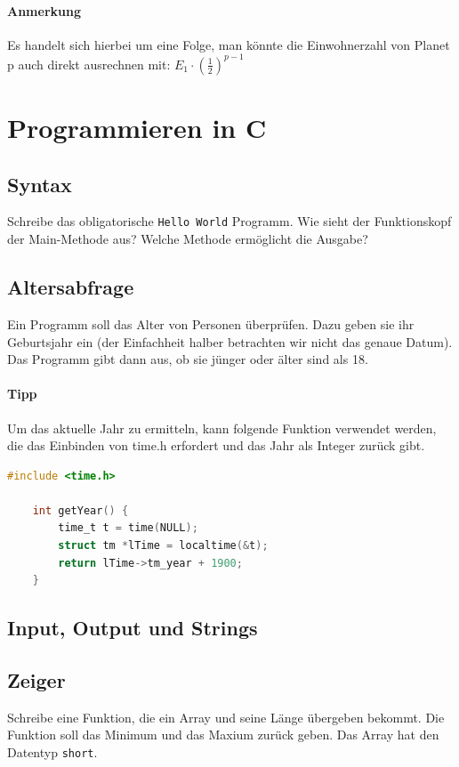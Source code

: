 \documentclass[11pt, a4paper]{article}
\begin{document}
\paragraph{Anmerkung} Es handelt sich hierbei um eine Folge, man könnte die Einwohnerzahl von Planet p auch direkt ausrechnen mit: $E_1 \cdot \left(\frac{1}{2}\right)^{p-1}$


\newpage
\section{Programmieren in C}
\subsection{Syntax}
Schreibe das obligatorische \texttt{Hello World} Programm. Wie sieht der Funktionskopf der Main-Methode aus? Welche Methode ermöglicht die Ausgabe?


\subsection{Altersabfrage}
Ein Programm soll das Alter von Personen überprüfen. Dazu geben sie ihr Geburtsjahr ein (der Einfachheit halber betrachten wir nicht das genaue Datum). Das Programm gibt dann aus, ob sie jünger oder älter sind als 18.

\paragraph{Tipp} Um das aktuelle Jahr zu ermitteln, kann folgende Funktion verwendet werden, die das Einbinden von time.h erfordert und das Jahr als Integer zurück gibt.
\begin{lstlisting}[language=C]
	#include <time.h>

	int getYear() {
		time_t t = time(NULL);
		struct tm *lTime = localtime(&t);
		return lTime->tm_year + 1900;
	}
\end{lstlisting}


\subsection{Input, Output und Strings}

\subsection{Zeiger}
\label{zeigerAufgabe}
Schreibe eine Funktion, die ein Array und seine Länge übergeben bekommt. Die Funktion soll das Minimum und das Maxium zurück geben. Das Array hat den Datentyp \texttt{short}.
\end{document}
